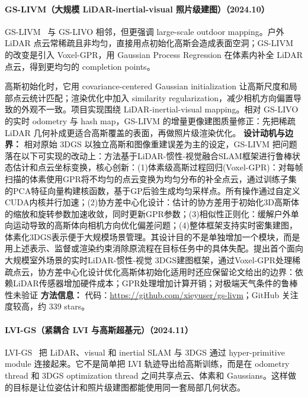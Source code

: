 \paragraph{GS-LIVM（大规模 LiDAR-inertial-visual 照片级建图）（2024.10）}
GS-LIVM~\cite{2410_17084} 与 GS-LIVO 相邻，但更强调 large-scale outdoor mapping。户外 LiDAR 点云常稀疏且非均匀，直接用点初始化高斯会造成表面空洞；GS-LIVM 的改变是引入 Voxel-GPR，用 Gaussian Process Regression 在体素内补全 LiDAR 点云，得到更均匀的 completion points。

高斯初始化时，它用 covariance-centered Gaussian initialization 让高斯尺度和局部点云统计匹配；渲染优化中加入 similarity regularization，减少相机方向偏置导致的外观不一致。项目实现围绕 LiDAR-inertial-visual mapping。相对 GS-LIVO 的实时 odometry 与 hash map，GS-LIVM 的增量更像建图质量修正：先把稀疏 LiDAR 几何补成更适合高斯覆盖的表面，再做照片级渲染优化。
\textbf{设计动机与边界：} 相对原始 3DGS 以独立高斯和图像重建误差为主的设定，GS-LIVM 把问题落在以下可实现的改动上：方法基于LiDAR-惯性-视觉融合SLAM框架进行鲁棒状态估计和点云坐标变换，核心创新：(1)体素级高斯过程回归(Voxel-GPR)：对每帧扫描的体素使用GPR将不均匀的点云变换为均匀分布的补全点云，通过训练子集的PCA特征向量构建核函数，基于GP后验生成均匀采样点。所有操作通过自定义CUDA内核并行加速；(2)协方差中心化设计：估计的协方差用于初始化3D高斯体的缩放和旋转参数加速收敛，同时更新GPR参数；(3)相似性正则化：缓解户外单向运动导致的高斯体向相机方向优化偏差问题；(4)整体框架支持实时密集建图，体素化3DGS表示便于大规模场景管理。其设计目的不是单独增加一个模块，而是用上述表示、监督或渲染约束消除原流程在目标任务中的具体失配。提出首个面向大规模室外场景的实时LiDAR-惯性-视觉 3DGS建图框架，通过Voxel-GPR处理稀疏点云，协方差中心化设计优化高斯体初始化适用时还应保留论文给出的边界：依赖LiDAR传感器增加硬件成本；GPR处理增加计算开销；对极端天气条件的鲁棒性未验证
\textbf{方法信息：} 代码：\url{https://github.com/xieyuser/gs-livm}；GitHub 关注度较高，约 339 stars。



\paragraph{LVI-GS（紧耦合 LVI 与高斯超基元）（2024.11）}
LVI-GS~\cite{2411_02703} 把 LiDAR、visual 和 inertial SLAM 与 3DGS 通过 hyper-primitive module 连接起来。它不是简单把 LVI 轨迹导出给高斯训练，而是在 odometry thread 和 3DGS optimization thread 之间共享点云、体素和 Gaussians。这样做的目标是让位姿估计和照片级建图都能使用同一套局部几何状态。

